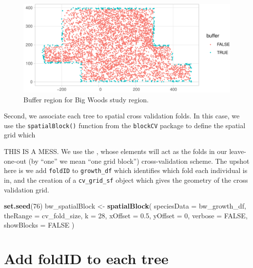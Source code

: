 \documentclass[12pt]{article}
\newenvironment{Shaded}{\begin{snugshade}}{\end{snugshade}}
\newcommand{\DataTypeTok}[1]{\textcolor[rgb]{0.13,0.29,0.53}{#1}}
\newcommand{\DecValTok}[1]{\textcolor[rgb]{0.00,0.00,0.81}{#1}}
\newcommand{\FloatTok}[1]{\textcolor[rgb]{0.00,0.00,0.81}{#1}}
\newcommand{\KeywordTok}[1]{\textcolor[rgb]{0.13,0.29,0.53}{\textbf{#1}}}
\newcommand{\NormalTok}[1]{#1}
\newcommand{\OtherTok}[1]{\textcolor[rgb]{0.56,0.35,0.01}{#1}}
\newcommand{\StringTok}[1]{\textcolor[rgb]{0.31,0.60,0.02}{#1}}
\begin{document}
\begin{figure}

{\centering \includegraphics[width=1\linewidth]{Figures/bw-define-buffer-1} 

}

\caption{Buffer region for Big Woods study region.}\label{fig:bw-define-buffer}
\end{figure}

Second, we associate each tree to spatial cross validation folds. In
this case, we use the \texttt{spatialBlock()} function from the
\texttt{blockCV} package to define the spatial grid which

THIS IS A MESS. We use the \citet{valavi_blockcv_2019}, whose elements
will act as the folds in our leave-one-out (by ``one'' we mean ``one
grid block'') cross-validation scheme. The upshot here is we add
\texttt{foldID} to \texttt{growth\_df} which identifies which fold each
individual is in, and the creation of a \texttt{cv\_grid\_sf} object
which gives the geometry of the cross validation grid.

\begin{Shaded}
\begin{Highlighting}[]
\KeywordTok{set.seed}\NormalTok{(}\DecValTok{76}\NormalTok{)}
\NormalTok{bw_spatialBlock <-}\StringTok{ }\KeywordTok{spatialBlock}\NormalTok{(}
  \DataTypeTok{speciesData =}\NormalTok{ bw_growth_df, }\DataTypeTok{theRange =}\NormalTok{ cv_fold_size, }\DataTypeTok{k =} \DecValTok{28}\NormalTok{, }\DataTypeTok{xOffset =} \FloatTok{0.5}\NormalTok{, }
  \DataTypeTok{yOffset =} \DecValTok{0}\NormalTok{, }\DataTypeTok{verbose =} \OtherTok{FALSE}\NormalTok{, }\DataTypeTok{showBlocks =} \OtherTok{FALSE}
\NormalTok{)}
\end{Highlighting}
\end{Shaded}

\hypertarget{add-foldid-to-each-tree}{%
\section{Add foldID to each tree}\label{add-foldid-to-each-tree}}
\end{document}

